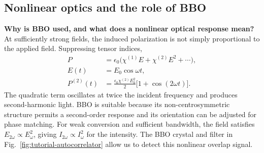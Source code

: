 \subsection{Nonlinear optics and the role of BBO}
\textbf{Why is BBO used, and what does a nonlinear optical response mean?}
At sufficiently strong fields, the induced polarization is not simply proportional to the applied field. Suppressing tensor indices,
\begin{align}
P&=\epsilon_0\bigl(\chi^{(1)}E+\chi^{(2)}E^2+\cdots\bigr),\\
E(t)&=E_0\cos\omega t,\\
P^{(2)}(t)&=\frac{\epsilon_0\chi^{(2)}E_0^2}{2}
                 \bigl[1+\cos(2\omega t)\bigr].
\end{align}
The quadratic term oscillates at twice the incident frequency and produces second-harmonic light. BBO is suitable because its non-centrosymmetric structure permits a second-order response and its orientation can be adjusted for phase matching. For weak conversion and sufficient bandwidth, the field satisfies $E_{2\omega}\propto E_\omega^2$, giving $I_{2\omega}\propto I_\omega^2$ for the intensity. The BBO crystal and filter in Fig.~\ref{fig:tutorial-autocorrelator} allow us to detect this nonlinear overlap signal.


